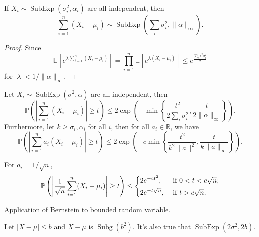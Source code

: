 \begin{lemma}
	If \(X_i \sim \mathop{\mathrm{SubExp}}(\sigma _i^{2} , \alpha _i) \) are all independent, then
	\[
		\sum_{i=1}^{n} (X_i - \mu _i) \sim \mathop{\mathrm{SubExp}}\left( \sum_{i} \sigma _i^2, \lVert \alpha  \rVert_\infty \right).
	\]
\end{lemma}
\begin{proof}
	Since
	\[
		\mathbb{E}_{}\left[e^{\lambda \sum_{i=1}^{n} (X_i - \mu _i)} \right]
		= \prod_{i=1}^{n} \mathbb{E}_{}\left[e^{\lambda (X_i - \mu _i)} \right]
		\leq e^{\frac{\sum_{i} \lambda ^2 \sigma _i^2}{2}}
	\]
	for \(\vert \lambda \vert < 1 / \lVert \alpha \rVert_\infty \).
\end{proof}


\begin{theorem}\label{thm:Bernstein-inequality}
	Let \(X_i \sim \mathop{\mathrm{SubExp}}(\sigma ^{2} , \alpha ) \) are all independent, then
	\[
		\mathbb{P} \left( \left\vert \sum_{i=1}^{n} (X_i - \mu _i) \right\vert \geq t \right) \leq 2 \exp \left( - \min \left\{ \frac{t^{2} }{2 \sum_{i} \sigma _i^2}, \frac{t}{2 \lVert \alpha \rVert_\infty } \right\} \right) .
	\]
	Furthermore, let \(k \geq \sigma _i, \alpha _i\) for all \(i\), then for all \(a_i\in \mathbb{R} \), we have
	\[
		\mathbb{P} \left( \left\vert  \sum_{i=1}^{n} a_i(X_i - \mu _i) \right\vert  \geq t \right) \leq 2 \exp \left( - c \min \left\{ \frac{t^{2} }{k^2 \lVert a \rVert ^2}, \frac{t}{k \lVert a \rVert _\infty } \right\} \right) .
	\]
\end{theorem}

\begin{note}
	For \(a_i = 1 / \sqrt{n} \),
	\[
		\mathbb{P} \left( \left\vert \frac{1}{\sqrt{n} } \sum_{i=1}^{n} (X_i - \mu _i) \right\vert \geq t \right) \leq
		\begin{dcases}
			2e^{-ct^{2} },    & \text{ if } 0 < t < c\sqrt{n}  ; \\
			2e^{-t\sqrt{n} }, & \text{ if } t > c\sqrt{n} .
		\end{dcases}
	\]
\end{note}

Application of Bernstein to bounded random variable.

\begin{lemma}
	Let \(\vert X - \mu \vert \leq b\) and \(X - \mu \) is \(\mathop{\mathrm{Subg}}(b^2) \). It's also true that \(\mathop{\mathrm{SubExp}}(2 \sigma ^{2} , 2b) \).
\end{lemma}